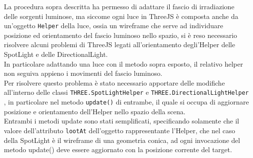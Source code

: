 La procedura sopra descritta ha permesso di adattare il fascio di irradiazione delle sorgenti luminose, ma siccome ogni luce in ThreeJS è composta anche da un’oggetto \texttt{Helper} della luce, ossia un wireframe che serve ad individuare posizione ed orientamento del fascio luminoso nello spazio, si è reso necessario risolvere alcuni problemi di ThreeJS legati all’orientamento degli’Helper delle SpotLight e delle DirectionalLight.
\\ 
In particolare adattando una luce con il metodo sopra esposto, il relativo helper non seguiva appieno i movimenti del fascio luminoso.
\\
Per risolvere questo problema è stato necessario apportare delle modifiche all’interno delle classi \texttt{THREE.SpotLightHelper} e \texttt{THREE.DirectionalLightHelper} , in particolare nel metodo \texttt{update()} di entrambe, il quale si occupa di aggiornare posizione e orientamento dell’Helper nello spazio della scena.
\\
Entrambi i metodi update sono stati semplificati, specificando solamente che il valore dell’attributo \texttt{lootAt} dell’oggetto rappresentante l’Helper, che nel caso della SpotLight è il wireframe di una geometria conica, ad ogni invocazione del metodo update() deve essere aggiornato con la posizione corrente del target. 